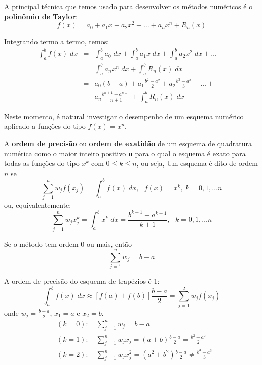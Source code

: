 A principal técnica que temos usado para desenvolver os métodos numéricos é o {\bf polinômio de Taylor}:
$$f(x)=a_0+a_1x + a_2x^2+\ldots + a_n x^n +R_n(x)$$

Integrando termo a termo, temos:
\begin{eqnarray*}
\int_a^bf(x)\;dx&=& \int_a^b a_0\;dx+\int_a^ba_1x\;dx + \int_a^ba_2x^2\;dx+\ldots+\\
&& \int_a^ba_n x^n\;dx +\int_a^bR_n(x)\;dx\\
&=& a_0(b-a)+a_1\frac{b^2-a^2}{2} + a_2\frac{b^3-a^3}{3} +\ldots+\\
&&a_n \frac{b^{n+1}-a^{n+1}}{n+1} +\int_a^bR_n(x)\;dx
\end{eqnarray*}

Neste momento, é natural investigar o desempenho de um esquema numérico aplicado a funções do tipo $f(x)=x^n$.

\begin{defn} A {\bf ordem de precisão} ou {\bf ordem de exatidão} de um esquema de quadratura numérica como o maior inteiro positivo {\bf n} para o qual o esquema é exato para todas as funções do tipo $x^k$ com $0\leq k\leq n$, ou seja,
Um esquema é dito de ordem $n$ se
$$\sum_{j=1}^n w_jf(x_j)=\int_a^b f(x)\;dx,~~~f(x)=x^k,~k=0,1,\ldots n$$
ou, equivalentemente:
$$\sum_{j=1}^n w_jx_j^k=\int_a^b x^k\;dx=\frac{b^{k+1}-a^{k+1}}{k+1},~~~k=0,1,\ldots n$$
\end{defn}

\begin{obs} Se o método tem ordem $0$ ou mais, então
$$\sum_{j=1}^n w_j=b-a$$
\end{obs}

\begin{ex}
A ordem de precisão do esquema de trapézios é 1:
$$\int_a^b f(x)\;dx \approx \left[f(a)+f(b)\right]\frac{b-a}{2}=\sum_{j=1}^2w_jf(x_j)$$
onde $w_j=\frac{b-a}{2}$, $x_1=a$ e $x_2=b$.
\begin{eqnarray*}
  &(k=0):\quad\sum_{j=1}^n w_j = b-a\\
  &(k=1):\quad\sum_{j=1}^n w_jx_j = (a+b)\frac{b-a}{2}=\frac{b^2-a^2}{2}\\
  &(k=2):\quad\sum_{j=1}^n w_jx_j^2 = (a^2+b^2)\frac{b-a}{2}\neq\frac{b^3-a^3}{3}
\end{eqnarray*}
\end{ex}

